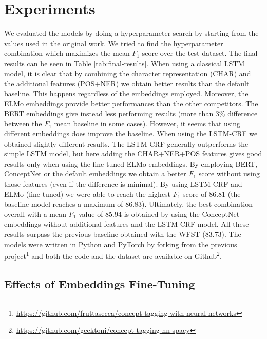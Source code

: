 \documentclass[11pt,a4paper]{article}
\begin{document}
\section{Experiments}

We evaluated the models by doing a hyperparameter search by starting from the values used in the original work. We tried to find the hyperparameter combination which maximizes the mean $F_1$ score over the test dataset. The final results can be seen in Table \ref{tab:final-results}.
When using a classical LSTM model, it is clear that by combining the character representation (CHAR) and the additional features (POS+NER) we obtain better results than the default baseline. This happens regardless of the embeddings employed. Moreover, the ELMo embeddings provide better performances than the other competitors. 
The BERT embeddings give instead less performing results (more than 3\% difference between the $F_1$ mean baseline in some cases). However, it seems that using different embeddings does improve the baseline.
When using the LSTM-CRF we obtained slightly different results. The LSTM-CRF generally outperforms the simple LSTM model, but here adding the CHAR+NER+POS features gives good results only when using the fine-tuned ELMo embeddings.  By employing BERT, ConceptNet or the default embeddings we obtain a better $F_1$ score without using those features (even if the difference is minimal).
By using LSTM-CRF and ELMo (fine-tuned) we were able to reach the highest $F_1$ score of 86.81 (the baseline model reaches a maximum of 86.83). Ultimately, the best combination overall with a mean $F_1$ value of  85.94 is obtained by using the ConceptNet embeddings without additional features and the LSTM-CRF model. All these results surpass the previous baseline obtained with the WFST (83.73).
The models were written in Python and PyTorch by forking from the previous project\footnote{\url{https://github.com/fruttasecca/concept-tagging-with-neural-networks}} and both the code and the dataset are available on Github\footnote{\url{https://github.com/geektoni/concept-tagging-nn-spacy}}.

\subsection{Effects of Embeddings Fine-Tuning}
\end{document}
